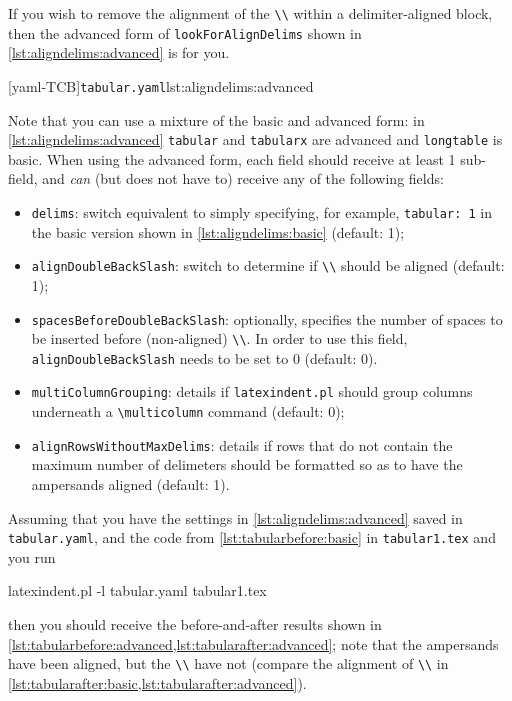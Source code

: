 	If you wish to remove the alignment of the \lstinline!\\! within a delimiter-aligned block, then the
	advanced form of \texttt{lookForAlignDelims} shown in \cref{lst:aligndelims:advanced} is for you.

	[yaml-TCB]{\texttt{tabular.yaml}}{lst:aligndelims:advanced}

	Note that you can use a mixture of the basic and advanced form: in \cref{lst:aligndelims:advanced} \texttt{tabular} and \texttt{tabularx}
	are advanced and \texttt{longtable} is basic. When using the advanced form, each field should receive at least 1 sub-field, and \emph{can}
	(but does not have to) receive any of the following fields:
	\begin{itemize}
		\item \texttt{delims}: switch equivalent to simply specifying, for example, \texttt{tabular: 1} in
		      the basic version shown in \cref{lst:aligndelims:basic} (default: 1);
		\item \texttt{alignDoubleBackSlash}: switch to determine if \lstinline!\\! should be aligned (default: 1);
		\item \texttt{spacesBeforeDoubleBackSlash}: optionally, specifies the number of spaces to be inserted
		      before (non-aligned) \lstinline!\\!. In order to use this field, \texttt{alignDoubleBackSlash} needs
		      to be set to 0 (default: 0).
		\item \texttt{multiColumnGrouping}: details if \texttt{latexindent.pl} should group columns
		      underneath a \lstinline!\multicolumn! command (default: 0);
		\item \texttt{alignRowsWithoutMaxDelims}: details if rows that do not contain the
		      maximum number of delimeters should be formatted so as to have the ampersands aligned (default: 1).
	\end{itemize}

	Assuming that you have the settings in \cref{lst:aligndelims:advanced} saved in \texttt{tabular.yaml}, and the code
	from \cref{lst:tabularbefore:basic} in \texttt{tabular1.tex} and you run
	\begin{commandshell}
latexindent.pl -l tabular.yaml tabular1.tex 
\end{commandshell}
	then you should receive the before-and-after results shown in
	\cref{lst:tabularbefore:advanced,lst:tabularafter:advanced}; note that the ampersands have been aligned, but
	the \lstinline!\\! have not (compare the alignment of \lstinline!\\! in \cref{lst:tabularafter:basic,lst:tabularafter:advanced}).

